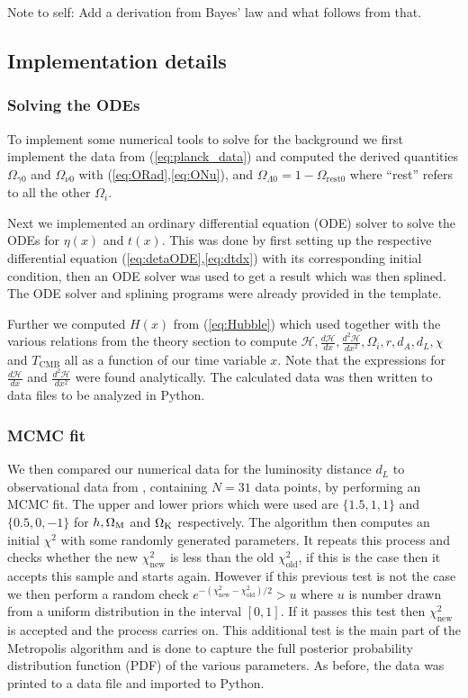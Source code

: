 \documentclass[%
reprint,
 amsmath,amssymb,
 aps,
]{revtex4-2}
\newcommand{\Hp}{\mathcal{H}}
\begin{document}
\color{red}Note to self: Add a derivation from Bayes' law and what follows from that.\color{black}

\subsection{Implementation details}
\subsubsection{Solving the ODEs}
To implement some numerical tools to solve for the background we first implement the data from (\ref{eq:planck_data}) and computed the derived quantities $\Omega_{\gamma0}$ and $\Omega_{\nu0}$ with (\ref{eq:ORad},\ref{eq:ONu}), and $\Omega_{\Lambda0}=1-\Omega_\text{rest0}$ where ``rest'' refers to all the other $\Omega_i$.  

Next we implemented an ordinary differential equation (ODE) solver to solve the ODEs for $\eta(x)$ and $t(x)$. This was done by first setting up the respective differential equation (\ref{eq:detaODE},\ref{eq:dtdx}) with its corresponding initial condition, then an ODE solver was used to get a result which was then splined. The ODE solver and splining programs were already provided in the template. 

Further we computed $H(x)$ from (\ref{eq:Hubble}) which used together with the various relations from the theory section to compute $\Hp,\frac{d\Hp}{dx},\frac{d^2\Hp}{dx^2},\Omega_i,r,d_A,d_L,\chi$ and $T_{\text{CMB}}$ all as a function of our time variable $x$. Note that the expressions for $\frac{d\Hp}{dx}$ and $\frac{d^2\Hp}{dx^2}$ were found analytically. The calculated data was then written to data files to be analyzed in Python.
\subsubsection{MCMC fit}
We then compared our numerical data  for the luminosity distance $d_L$ to observational data from \cite{SDSS:2014iwm}, containing $N=31$ data points, by performing an MCMC fit. The upper and lower priors which were used are $\{1.5,1,1\}$ and $\{0.5,0,-1\}$ for $h, \Omega_{\text M}$ and $\Omega_{\text K}$ respectively. The algorithm then computes an initial $\chi^2$ with some randomly generated parameters. It repeats this process and checks whether the new $\chi^2_\text{new}$ is less than the old $\chi^2_\text{old}$, if this is the case then it accepts this sample and starts again. However if this previous test is not the case we then perform a random check $e^{-(\chi^2_\text{new}-\chi_\text{old}^2)/2}>u$ where $u$ is number drawn from a uniform distribution in the interval $[0,1]$. If it passes this test then $\chi^2_\text{new}$ is accepted and the process carries on. This additional test is the main part of the Metropolis algorithm and is done to capture the full posterior probability distribution function (PDF) of the various parameters.  As before, the data was printed to a data file and imported to Python.
\end{document}
